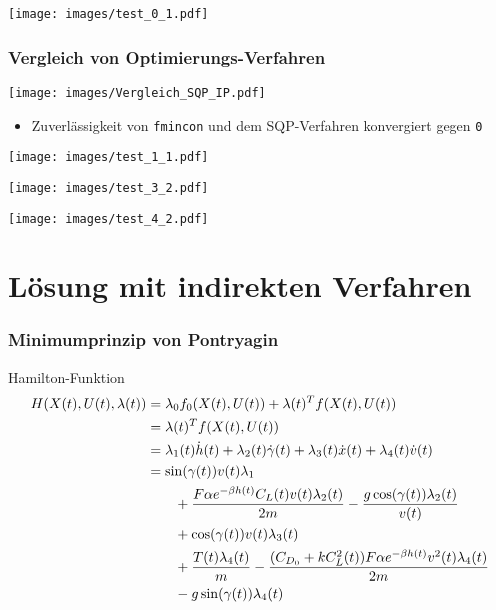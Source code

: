 \documentclass[aspectratio=169]{beamer}
\begin{document}
\begin{frame}
  \texttt{[image: images/test\_0\_1.pdf]}
\end{frame}

\begin{frame}
  \frametitle{Vergleich von Optimierungs-Verfahren}
  \texttt{[image: images/Vergleich\_SQP\_IP.pdf]}
  \begin{itemize}
    \item Zuverlässigkeit von \texttt{fmincon} und dem SQP-Verfahren konvergiert gegen \texttt{0}
  \end{itemize}
\end{frame}

\begin{frame}
  \texttt{[image: images/test\_1\_1.pdf]}
\end{frame}

\begin{frame}
  \texttt{[image: images/test\_3\_2.pdf]}
\end{frame}

\begin{frame}
  \texttt{[image: images/test\_4\_2.pdf]}
\end{frame}


\section{Lösung mit indirekten Verfahren}
\begin{frame}
  \frametitle{Minimumprinzip von Pontryagin}
  \scriptsize
  \begin{block}{Hamilton-Funktion}  
 \begin{align*} 
        H(X(t),U(t),\lambda(t)) &= \lambda_0 f_0(X(t),U(t)) + \lambda(t)^T f(X(t),U(t)) \\\
        &= \lambda(t)^T f(X(t),U(t)) \\\
        &= \lambda_1(t) \dot{h}(t) + \lambda_2(t) \dot{\gamma}(t) + \lambda_3(t) \dot{x}(t) + \lambda_4(t) \dot{v}(t) \\\
        &= \sin(\gamma(t)) v(t) \lambda_1 \\\
        &\hspace{7mm} + \dfrac{F \alpha e^{-\beta h(t)} C_L(t) v(t) \lambda_2(t)}{2m} - \dfrac{g \cos(\gamma(t)) \lambda_2(t)}{v(t)} \\\
        &\hspace{7mm} + \cos(\gamma(t)) v(t) \lambda_3(t) \\\
        &\hspace{7mm} + \dfrac{T(t) \lambda_4(t)}{m} - \dfrac{(C_{D_0} + k C_L^2(t)) F \alpha e^{-\beta h(t)} v^2(t) \lambda_4(t)}{2m} \\\
        &\hspace{7mm} - g \sin(\gamma(t)) \lambda_4(t)
\end{align*}
\end{block}
\end{frame}
\end{document}
